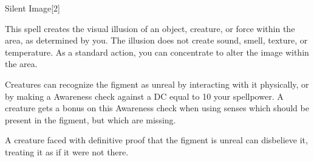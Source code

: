 \begin{spellsection}{Silent Image}[2]
    \begin{spellheader}
    \end{spellheader}
    \begin{spellcontent}
        \begin{spelltargetinginfo}
        \end{spelltargetinginfo}
        \begin{spelleffects}
            \spelleffect This spell creates the visual illusion of an object, creature, or force within the area, as determined by you. The illusion does not create sound, smell, texture, or temperature. As a standard action, you can concentrate to alter the image within the area.
            \spelldur \durshort
        \end{spelleffects}
    \end{spellcontent}
    \begin{spellfooter}
        \spellnotes Creatures can recognize the figment as unreal by interacting with it physically, or by making a Awareness check against a DC equal to 10 \add your spellpower. A creature gets a  bonus on this Awareness check when using senses which should be present in the figment, but which are missing.

        A creature faced with definitive proof that the figment is unreal can disbelieve it, treating it as if it were not there.
        \miscastexplode
    \end{spellfooter}
\end{spellsection}

